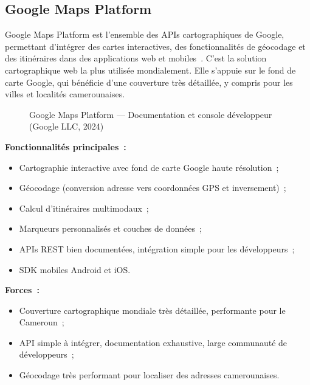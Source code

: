 \documentclass[12pt, a4paper]{report}
\begin{document}
\subsection{Google Maps Platform}

Google Maps Platform est l'ensemble des APIs cartographiques de Google, permettant
d'intégrer des cartes interactives, des fonctionnalités de géocodage et des
itinéraires dans des applications web et mobiles~\cite{googlemaps2024}. C'est la
solution cartographique web la plus utilisée mondialement. Elle s'appuie sur le
fond de carte Google, qui bénéficie d'une couverture très détaillée, y compris
pour les villes et localités camerounaises.

\begin{figure}[H]
  \centering
  \caption{Google Maps Platform --- Documentation et console développeur (Google LLC, 2024)}
  \label{fig:google-maps}
\end{figure}

\noindent\textbf{Fonctionnalités principales~:}
\begin{itemize}[itemsep=2pt, topsep=4pt, leftmargin=1.5cm]
  \item Cartographie interactive avec fond de carte Google haute résolution~;
  \item Géocodage (conversion adresse vers coordonnées GPS et inversement)~;
  \item Calcul d'itinéraires multimodaux~;
  \item Marqueurs personnalisés et couches de données~;
  \item APIs REST bien documentées, intégration simple pour les développeurs~;
  \item SDK mobiles Android et iOS.
\end{itemize}

\noindent\textbf{Forces~:}
\begin{itemize}[itemsep=2pt, topsep=4pt, leftmargin=1.5cm]
  \item Couverture cartographique mondiale très détaillée, performante pour le
    Cameroun~;
  \item API simple à intégrer, documentation exhaustive, large communauté de
    développeurs~;
  \item Géocodage très performant pour localiser des adresses camerounaises.
\end{itemize}
\end{document}
